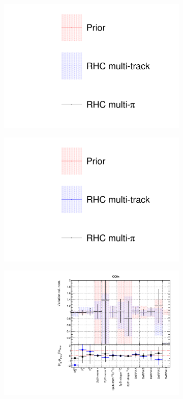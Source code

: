 \begin{figure}[t]
\centering
\begin{subfigure}{0.3\textwidth}
  \centering
  \includegraphics[width=1.0\linewidth, trim={5mm  130mm 0mm 10mm}, clip]{figs/rhcmpdat248_leg}	
\end{subfigure}
\begin{subfigure}{0.3\textwidth}
  \centering
  \includegraphics[width=1.0\linewidth, trim={5mm  0mm 0mm 70mm}, clip]{figs/rhcmpdat248_leg}	
\end{subfigure}
\begin{subfigure}{0.49\textwidth}
  \centering
  \includegraphics[width=0.95\linewidth]{figs/rhcmpasmvxsec1}

\end{subfigure}
\end{figure}
